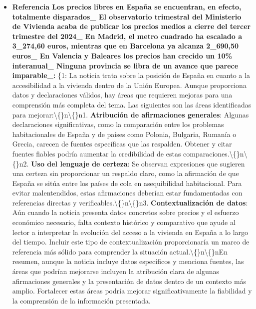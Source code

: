 \documentclass[10pt,a4paper]{article}
\begin{document}
\begin{itemize}[leftmargin=*]
            \item \textbf{Referencia Los precios libres en Espa\~{n}a se encuentran, en efecto, totalmente disparados\_ El observatorio trimestral del Ministerio de Vivienda acaba de publicar los precios medios a cierre del tercer trimestre del 2024\_ En Madrid, el metro cuadrado ha escalado a 3\_274,60 euros, mientras que en Barcelona ya alcanza 2\_690,50 euros\_ En Valencia y Baleares los precios han crecido un 10\% interanual\_ Ninguna provincia se libra de un avance que parece imparable\_:} \{{}1{}: {}La noticia trata sobre la posici\'{o}n de Espa\~{n}a en cuanto a la accesibilidad a la vivienda dentro de la Uni\'{o}n Europea. Aunque proporciona datos y declaraciones v\'{a}lidos, hay \'{a}reas que requieren mejoras para una comprensi\'{o}n m\'{a}s completa del tema. Las siguientes son las \'{a}reas identificadas para mejorar:\textbackslash\{\}n\textbackslash\{\}n1. \textbf{Atribuci\'{o}n de afirmaciones generales}: Algunas declaraciones significativas, como la comparaci\'{o}n entre los problemas habitacionales de Espa\~{n}a y de pa\'{i}ses como Polonia, Bulgaria, Ruman\'{i}a o Grecia, carecen de fuentes espec\'{i}ficas que las respalden. Obtener y citar fuentes fiables podr\'{i}a aumentar la credibilidad de estas comparaciones.\textbackslash\{\}n\textbackslash\{\}n2. \textbf{Uso del lenguaje de certeza}: Se observan expresiones que sugieren una certeza sin proporcionar un respaldo claro, como la afirmaci\'{o}n de que {}Espa\~{n}a se sit\'{u}a entre los pa\'{i}ses de cola en {}asequibilidad{} habitacional{}. Para evitar malentendidos, estas afirmaciones deber\'{i}an estar fundamentadas con referencias directas y verificables.\textbackslash\{\}n\textbackslash\{\}n3. \textbf{Contextualizaci\'{o}n de datos}: A\'{u}n cuando la noticia presenta datos concretos sobre precios y el esfuerzo econ\'{o}mico necesario, falta contexto hist\'{o}rico y comparativo que ayude al lector a interpretar la evoluci\'{o}n del acceso a la vivienda en Espa\~{n}a a lo largo del tiempo. Incluir este tipo de contextualizaci\'{o}n proporcionar\'{i}a un marco de referencia m\'{a}s s\'{o}lido para comprender la situaci\'{o}n actual.\textbackslash\{\}n\textbackslash\{\}nEn resumen, aunque la noticia incluye datos espec\'{i}ficos y menciona fuentes, las \'{a}reas que podr\'{i}an mejorarse incluyen la atribuci\'{o}n clara de algunas afirmaciones generales y la presentaci\'{o}n de datos dentro de un contexto m\'{a}s amplio. Fortalecer estas \'{a}reas podr\'{i}a mejorar significativamente la fiabilidad y la comprensi\'{o}n de la informaci\'{o}n presentada.{}
    \end{itemize}
\vspace{1em}
\end{document}
